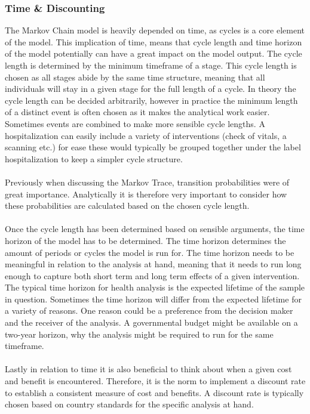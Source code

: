 \documentclass[a4paper,12pt]{article}
\begin{document}
\subsubsection*{Time \& Discounting}
The Markov Chain model is heavily depended on time, as cycles is a core element of the model. This implication of time, means that cycle length and time horizon of the model potentially can have a great impact on the model output. The cycle length is determined by the minimum timeframe of a stage. This cycle length is chosen as all stages abide by the same time structure, meaning that all individuals will stay in a given stage for the full length of a cycle. In theory the cycle length can be decided arbitrarily, however in practice the minimum length of a distinct event is often chosen as it makes the analytical work easier. Sometimes events are combined to make more sensible cycle lengths. A hospitalization can easily include a variety of interventions (check of vitals, a scanning etc.) for ease these would typically be grouped together under the label hospitalization to keep a simpler cycle structure. 
\\\\
Previously when discussing the Markov Trace, transition probabilities were of great importance. Analytically it is therefore very important to consider how these probabilities are calculated based on the chosen cycle length.
\\\\
Once the cycle length has been determined based on sensible arguments, the time horizon of the model has to be determined. The time horizon determines the amount of periods or cycles the model is run for. The time horizon needs to be meaningful in relation to the analysis at hand, meaning that it needs to run long enough to capture both short term and long term effects of a given intervention. The typical time horizon for health analysis is the expected lifetime of the sample in question. Sometimes the time horizon will differ from the expected lifetime for a variety of reasons. One reason could be a preference from the decision maker and the receiver of the analysis. A governmental budget might be available on a two-year horizon, why the analysis might be required to run for the same timeframe. 
\\\\
Lastly in relation to time it is also beneficial to think about when a given cost and benefit is encountered. Therefore, it is the norm to implement a discount rate to establish a consistent measure of cost and benefits. A discount rate is typically chosen based on country standards for the specific analysis at hand.
\end{document}
